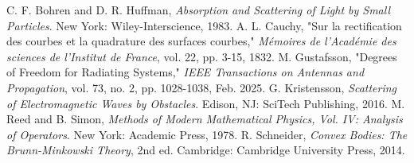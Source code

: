 \documentclass[11pt,a4paper]{article}
\begin{document}
\begin{thebibliography}{9}
     C. F. Bohren and D. R. Huffman, \textit{Absorption and Scattering of Light by Small Particles}. New York: Wiley-Interscience, 1983.
     A. L. Cauchy, "Sur la rectification des courbes et la quadrature des surfaces courbes," \textit{Mémoires de l'Académie des sciences de l'Institut de France}, vol. 22, pp. 3-15, 1832.
     M. Gustafsson, "Degrees of Freedom for Radiating Systems," \textit{IEEE Transactions on Antennas and Propagation}, vol. 73, no. 2, pp. 1028-1038, Feb. 2025.
     G. Kristensson, \textit{Scattering of Electromagnetic Waves by Obstacles}. Edison, NJ: SciTech Publishing, 2016.
     M. Reed and B. Simon, \textit{Methods of Modern Mathematical Physics, Vol. IV: Analysis of Operators}. New York: Academic Press, 1978.
     R. Schneider, \textit{Convex Bodies: The Brunn-Minkowski Theory}, 2nd ed. Cambridge: Cambridge University Press, 2014.
\end{thebibliography}
\end{document}
